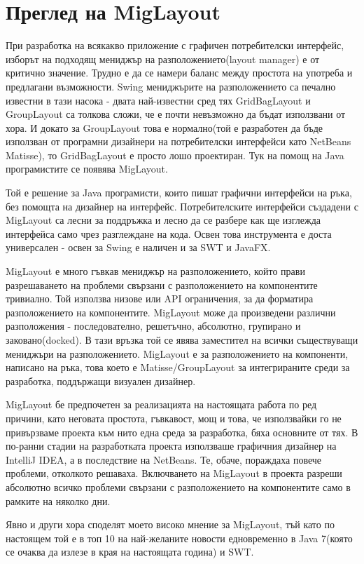 \section{Преглед на MigLayout}
При разработка на всякакво приложение с графичен потребителски
интерфейс, изборът на подходящ мениджър на разположението(layout
manager) е от критично значение. Трудно е да се намери баланс между
простота на употреба и предлагани възможности. Swing мениджърите на
разположението са печално известни в тази насока - двата най-известни
сред тях GridBagLayout и GroupLayout са толкова сложи, че е почти
невъзможно да бъдат използвани от хора. И докато за GroupLayout това е
нормално(той е разработен да бъде използван от програмни дизайнери на
потребителски интерфейси като NetBeans Matisse), то GridBagLayout е
просто лошо проектиран. Тук на помощ на Java програмистите се появява
MigLayout.

Той е решение за Java програмисти, които пишат графични интерфейси на
ръка, без помощта на дизайнер на интерфейс. Потребителските интерфейси
създадени с MigLayout са лесни за поддръжка и лесно да се разбере как
ще изглежда интерфейса само чрез разглеждане на кода. Освен това
инструмента е доста универсален - освен за Swing е наличен и за SWT и
JavaFX. 

MigLayout е много гъвкав мениджър на разположението, който прави
разрешаването на проблеми свързани с разположението на компонентите
тривиално. Той използва низове или API ограничения, за да форматира
разположението на компонентите. MigLayout може да произведени различни
разположения - последователно, решетъчно, абсолютно, групирано и
заковано(docked). В тази връзка той се явява заместител на всички
съществуващи мениджъри на разположението. MigLayout е за
разположението на компоненти, написано на ръка, това което е
Matisse/GroupLayout за интегрираните среди за разработка, поддържащи
визуален дизайнер.

MigLayout бе предпочетен за реализацията на настоящата работа по ред
причини, като неговата простота, гъвкавост, мощ и това, че използвайки го
не привързваме проекта към нито една среда за разработка, бяха основните
от тях. В по-ранни стадии на разработката проекта използваше графичния
дизайнер на IntelliJ IDEA, а в последствие на NetBeans. Те, обаче,
пораждаха повече проблеми, отколкото решаваха. Включването на
MigLayout в проекта разреши абсолютно всичко проблеми свързани с
разположението на компонентите само в рамките на няколко дни.

Явно и други хора споделят моето високо мнение за MigLayout, тъй като
по настоящем той е в топ 10 на най-желаните новости едновременно в
Java 7(която се очаква да излезе в края на настоящата година) и SWT.
